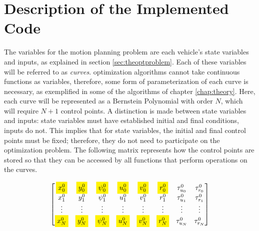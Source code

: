 \cleardoublepage
\label{chap:results}


\section{Description of the Implemented Code}
\label{sec:description_implementation}

\par The variables for the motion planning problem are each vehicle's state variables and inputs, as explained in section \ref{sec:theoptproblem}. Each of these variables will be referred to as \textit{curves}. optimization algorithms cannot take continuous functions as variables, therefore, some form of parameterization of each curve is necessary, as exemplified in some of the algorithms of chapter \ref{chap:theory}. Here, each curve will be represented as a Bernstein Polynomial with order $N$, which will require $N+1$ control points. A distinction is made between state variables and inputs: state variables must have established initial and final conditions, inputs do not. This implies that for state variables, the initial and final control points must be fixed; therefore, they do not need to participate on the optimization problem. The following matrix represents how the control points are stored so that they can be accessed by all functions that perform operations on the curves.

\begin{equation}
    \begin{bmatrix}
        \colorbox{yellow}{$\displaystyle x_0^0$} & \colorbox{yellow}{$\displaystyle y_0^0$} & \colorbox{yellow}{$\displaystyle \psi_0^0$} & \colorbox{yellow}{$\displaystyle u_0^0$} & \colorbox{yellow}{$\displaystyle v_0^0$} & \colorbox{yellow}{$\displaystyle r_0^0$} & \tau_{u_0}^0 & \tau_{r_0}^0 \\
        x_1^0 & y_1^0 & \psi_1^0 & u_1^0 & v_1^0 & r_1^0 & \tau_{u_1}^0 & \tau_{r_1}^0 \\
        \vdots & \vdots & \vdots & \vdots & \vdots & \vdots & \vdots & \vdots \\
        \colorbox{yellow}{$x_{N}^0$} & \colorbox{yellow}{$y_{N}^0$} & \colorbox{yellow}{$\psi_{N}^0$} & \colorbox{yellow}{$u_{N}^0$} & \colorbox{yellow}{$v_{N}^0$} & \colorbox{yellow}{$r_{N}^0$} & \tau_{u_{N}}^0 & \tau_{r_{N}}^0
    \end{bmatrix}
    \label{eq:matrixofvariables}
\end{equation}

